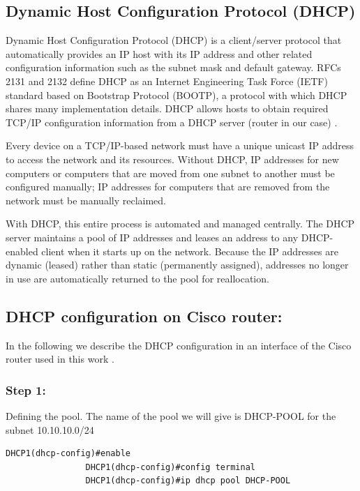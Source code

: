 \subsection{Dynamic Host Configuration Protocol (DHCP)}
Dynamic Host Configuration Protocol (DHCP) is a client/server protocol that automatically provides an \gls{IP} host with its IP address and other related configuration information such as the subnet mask and default gateway. RFCs 2131 and 2132 define DHCP as an Internet Engineering Task Force (IETF) standard based on Bootstrap Protocol (BOOTP), a protocol with which DHCP shares many implementation details. DHCP allows hosts to obtain required TCP/IP configuration information from a DHCP server (router in our case) \cite{DynamicHCP}.

Every device on a TCP/IP-based network must have a unique unicast IP address to access the network and its resources. Without DHCP, IP addresses for new computers or computers that are moved from one subnet to another must be configured manually; IP addresses for computers that are removed from the network must be manually reclaimed.

With DHCP, this entire process is automated and managed centrally. The DHCP server maintains a pool of IP addresses and leases an address to any DHCP-enabled client when it starts up on the network. Because the IP addresses are dynamic (leased) rather than static (permanently assigned), addresses no longer in use are automatically returned to the pool for reallocation.

\subsection{DHCP configuration on Cisco router:}
In the following we describe the DHCP configuration in an interface of the Cisco router used in this work \cite{DHCP}. 

\subsubsection{Step 1:}
Defining the pool. The name of the pool we will give is DHCP-POOL for the subnet 10.10.10.0/24
\begin{lstlisting}[style=cliStyle,  backgroundcolor=\color{codebackground}]
                DHCP1(dhcp-config)#enable
                DHCP1(dhcp-config)#config terminal
                DHCP1(dhcp-config)#ip dhcp pool DHCP-POOL
\end{lstlisting}

